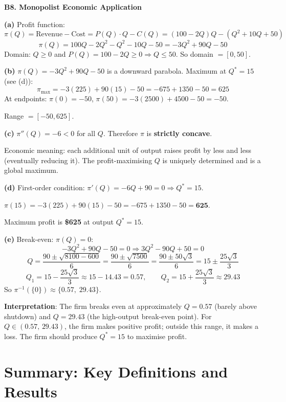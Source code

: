 \documentclass[12pt, a4paper]{article}
\theoremstyle{definition}
\begin{document}
\begin{solbox}
\textbf{B8. Monopolist Economic Application}

\textbf{(a)} Profit function:
\[
  \pi(Q) = \text{Revenue} - \text{Cost} = P(Q)\cdot Q - C(Q) = (100-2Q)Q - (Q^2+10Q+50)
\]
\[
  \pi(Q) = 100Q - 2Q^2 - Q^2 - 10Q - 50 = -3Q^2 + 90Q - 50
\]
Domain: $Q\geq 0$ and $P(Q)=100-2Q\geq 0 \Rightarrow Q\leq 50$. So domain $=[0,50]$.

\textbf{(b)} $\pi(Q)=-3Q^2+90Q-50$ is a downward parabola. Maximum at $Q^*=15$ (see (d)):
\[
  \pi_{\max} = -3(225)+90(15)-50 = -675+1350-50 = 625
\]
At endpoints: $\pi(0)=-50$, $\pi(50)=-3(2500)+4500-50=-50$.

Range $= [-50, 625]$.

\textbf{(c)} $\pi''(Q) = -6 < 0$ for all $Q$. Therefore $\pi$ is \textbf{strictly concave}.

Economic meaning: each additional unit of output raises profit by less and less (eventually reducing it). The profit-maximising $Q$ is uniquely determined and is a global maximum.

\textbf{(d)} First-order condition: $\pi'(Q)=-6Q+90=0 \Rightarrow Q^*=15$.

$\pi(15) = -3(225)+90(15)-50 = -675+1350-50 = \mathbf{625}$.

Maximum profit is \textbf{\$625} at output $Q^*=15$.

\textbf{(e)} Break-even: $\pi(Q)=0$:
\[
  -3Q^2+90Q-50=0 \Rightarrow 3Q^2-90Q+50=0
\]
\[
  Q = \frac{90\pm\sqrt{8100-600}}{6} = \frac{90\pm\sqrt{7500}}{6} = \frac{90\pm 50\sqrt{3}}{6} = 15\pm\frac{25\sqrt{3}}{3}
\]
\[
  Q_1 = 15 - \frac{25\sqrt{3}}{3}\approx 15-14.43=0.57, \qquad Q_2=15+\frac{25\sqrt{3}}{3}\approx 29.43
\]
So $\pi^{-1}(\{0\})\approx \{0.57,\; 29.43\}$.

\textbf{Interpretation}: The firm breaks even at approximately $Q=0.57$ (barely above shutdown) and $Q=29.43$ (the high-output break-even point). For $Q\in(0.57,\,29.43)$, the firm makes positive profit; outside this range, it makes a loss. The firm should produce $Q^*=15$ to maximise profit.
\end{solbox}

\section*{Summary: Key Definitions and Results}
\end{document}
